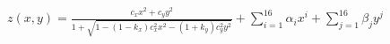 \documentclass[convert={convertexe={magick.exe}}]{standalone}
\begin{document}
$z(x, y) = \frac{c_x x^2 + c_y y^2}{1+ \sqrt{1-(1-k_x)c_x^2 x^2-(1+k_y)c_y^2y^2}} + \sum_{i=1}^{16} \alpha_i x^i + \sum_{j=1}^{16} \beta_j y^j $
\end{document}
